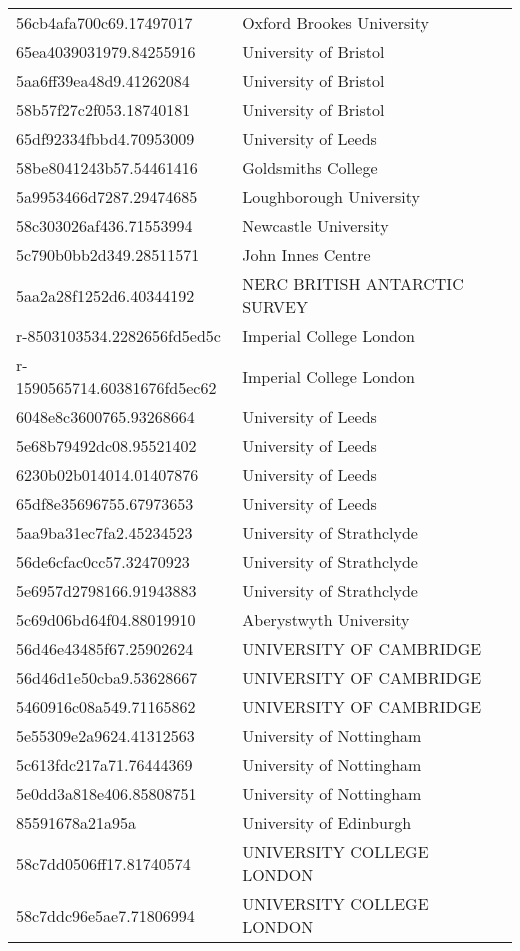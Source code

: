 \begin{tabular}{ll}
56cb4afa700c69.17497017 & Oxford Brookes University \\
65ea4039031979.84255916 & University of Bristol \\
5aa6ff39ea48d9.41262084 & University of Bristol \\
58b57f27c2f053.18740181 & University of Bristol \\
65df92334fbbd4.70953009 & University of Leeds \\
58be8041243b57.54461416 & Goldsmiths College \\
5a9953466d7287.29474685 & Loughborough University \\
58c303026af436.71553994 & Newcastle University \\
5c790b0bb2d349.28511571 & John Innes Centre \\
5aa2a28f1252d6.40344192 & NERC BRITISH ANTARCTIC SURVEY \\
r-8503103534.2282656fd5ed5c & Imperial College London \\
r-1590565714.60381676fd5ec62 & Imperial College London \\
6048e8c3600765.93268664 & University of Leeds \\
5e68b79492dc08.95521402 & University of Leeds \\
6230b02b014014.01407876 & University of Leeds \\
65df8e35696755.67973653 & University of Leeds \\
5aa9ba31ec7fa2.45234523 & University of Strathclyde \\
56de6cfac0cc57.32470923 & University of Strathclyde \\
5e6957d2798166.91943883 & University of Strathclyde \\
5c69d06bd64f04.88019910 & Aberystwyth University \\
56d46e43485f67.25902624 & UNIVERSITY OF CAMBRIDGE \\
56d46d1e50cba9.53628667 & UNIVERSITY OF CAMBRIDGE \\
5460916c08a549.71165862 & UNIVERSITY OF CAMBRIDGE \\
5e55309e2a9624.41312563 & University of Nottingham \\
5c613fdc217a71.76444369 & University of Nottingham \\
5e0dd3a818e406.85808751 & University of Nottingham \\
85591678a21a95a & University of Edinburgh \\
58c7dd0506ff17.81740574 & UNIVERSITY COLLEGE LONDON \\
58c7ddc96e5ae7.71806994 & UNIVERSITY COLLEGE LONDON \\

\end{tabular}
